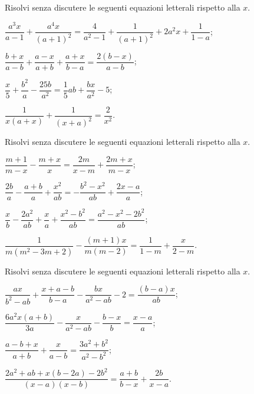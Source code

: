 \begin{esercizio}[\Ast]
\label{ese:17.60}
Risolvi senza discutere le seguenti equazioni letterali rispetto alla $x$.
\begin{enumeratea}
 \item $\dfrac{a^{3}x}{a-1}+\dfrac{a^{4}x}{(a+1)^{2}}=\dfrac{4}{a^{2}-1}+\dfrac{1}{(a+1)^{2}}+2a^{2}x+\dfrac{1}{1-a}$;
 \item $\dfrac{b+x}{a-b}+\dfrac{a-x}{a+b}+\dfrac{a+x}{b-a}=\dfrac{2(b-x)}{a-b}$;
 \item $\dfrac{x}{5}+\dfrac{b^{2}}{a}-\dfrac{25b}{a^{2}}=\dfrac{1}{5}ab+\dfrac{bx}{a^{2}}-5$;
 \item $\dfrac{1}{x(a+x)}+\dfrac{1}{(x+a)^{2}}=\dfrac{2}{x^{2}}$.
\end{enumeratea}
\end{esercizio}

\begin{esercizio}[\Ast]
\label{ese:17.61}
Risolvi senza discutere le seguenti equazioni letterali rispetto alla $x$.
\begin{enumeratea}
 \item $\dfrac{m+1}{m-x}-\dfrac{m+x}{x}=\dfrac{2m}{x-m}+\dfrac{2m+x}{m-x}$;
 \item $\dfrac{2b}{a}-\dfrac{a+b}{a}+\dfrac{x^{2}}{ab}=-\dfrac{b^{2}-x^{2}}{ab}+\dfrac{2x-a}{a}$;
 \item $\dfrac{x}{b}-\dfrac{2a^{2}}{ab}+\dfrac{x}{a}+\dfrac{x^{2}-b^{2}}{ab}=\dfrac{a^{2}-x^{2}-2b^{2}}{ab}$;
 \item $\dfrac{1}{m\left(m^{2}-3m+2\right)}-\dfrac{(m+1)x}{m(m-2)}=\dfrac{1}{1-m}+\dfrac{x}{2-m}$.
\end{enumeratea}
\end{esercizio}

\begin{esercizio}[\Ast]
\label{ese:17.62}
Risolvi senza discutere le seguenti equazioni letterali rispetto alla $x$.
\begin{enumeratea}
 \item $\dfrac{ax}{b^{2}-ab}+\dfrac{x+a-b}{b-a}-\dfrac{bx}{a^{2}-ab}-2=\dfrac{(b-a)x}{ab}$;
 \item $\dfrac{6a^{2}x(a+b)}{3a}-\dfrac{x}{a^{2}-ab}-\dfrac{b-x}{b}=\dfrac{x-a}{a}$;
 \item $\dfrac{a-b+x}{a+b}+\dfrac{x}{a-b}=\dfrac{3a^{2}+b^{2}}{a^{2}-b^{2}}$;
 \item $\dfrac{2a^{2}+ab+x(b-2a)-2b^{2}}{(x-a)(x-b)}=\dfrac{a+b}{b-x}+\dfrac{2b}{x-a}$.
\end{enumeratea}
\end{esercizio}


